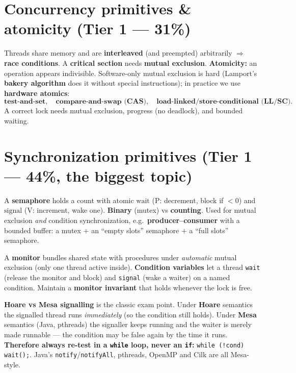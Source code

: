 \documentclass[11pt,a4paper]{article}
\begin{document}
\section{Concurrency primitives \& atomicity (Tier 1 --- 31\%)}

\begin{must}
Threads share memory and are \textbf{interleaved} (and preempted) arbitrarily $\Rightarrow$ \textbf{race conditions}. A \textbf{critical section} needs \textbf{mutual exclusion}. \textbf{Atomicity:} an operation appears indivisible. Software-only mutual exclusion is hard (Lamport's \textbf{bakery algorithm} does it without special instructions); in practice we use \textbf{hardware atomics}:
\[
\textbf{test-and-set},\quad \textbf{compare-and-swap (CAS)},\quad \textbf{load-linked/store-conditional (LL/SC)}.
\]
A correct lock needs mutual exclusion, progress (no deadlock), and bounded waiting.
\end{must}

\section{Synchronization primitives (Tier 1 --- 44\%, the biggest topic)}

\begin{must}[title=Semaphores]
A \textbf{semaphore} holds a count with atomic $\mathrm{wait}$ (P: decrement, block if $<0$) and $\mathrm{signal}$ (V: increment, wake one). \textbf{Binary} (mutex) vs \textbf{counting}. Used for mutual exclusion \emph{and} condition synchronization, e.g.\ \textbf{producer--consumer} with a bounded buffer: a mutex $+$ an ``empty slots'' semaphore $+$ a ``full slots'' semaphore.
\end{must}

\begin{must}[title=Monitors and condition variables]
A \textbf{monitor} bundles shared state with procedures under \emph{automatic} mutual exclusion (only one thread active inside). \textbf{Condition variables} let a thread \texttt{wait} (release the monitor and block) and \texttt{signal} (wake a waiter) on a named condition. Maintain a \textbf{monitor invariant} that holds whenever the lock is free.
\end{must}

\begin{gotcha}
\textbf{Hoare vs Mesa signalling} is the classic exam point. Under \textbf{Hoare} semantics the signalled thread runs \emph{immediately} (so the condition still holds). Under \textbf{Mesa} semantics (Java, pthreads) the signaller keeps running and the waiter is merely made runnable --- the condition may be false again by the time it runs. \textbf{Therefore always re-test in a \texttt{while} loop, never an \texttt{if}:} \verb|while (!cond) wait();|. Java's \texttt{notify}/\texttt{notifyAll}, pthreads, OpenMP and Cilk are all Mesa-style.
\end{gotcha}
\end{document}
